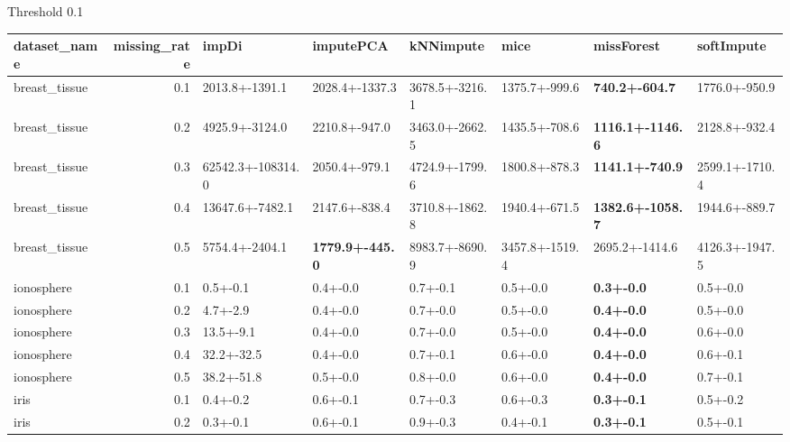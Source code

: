  Threshold 0.1 
 \begin{tabular}{lrllllll}
\toprule
 dataset_name &  missing_rate &             impDi &              imputePCA &      kNNimpute &           mice &              missForest &     softImpute \\
\midrule
breast_tissue &           0.1 &    2013.8+-1391.1 &         2028.4+-1337.3 & 3678.5+-3216.1 &  1375.7+-999.6 &   \textbf{740.2+-604.7} &  1776.0+-950.9 \\
breast_tissue &           0.2 &    4925.9+-3124.0 &          2210.8+-947.0 & 3463.0+-2662.5 &  1435.5+-708.6 & \textbf{1116.1+-1146.6} &  2128.8+-932.4 \\
breast_tissue &           0.3 & 62542.3+-108314.0 &          2050.4+-979.1 & 4724.9+-1799.6 &  1800.8+-878.3 &  \textbf{1141.1+-740.9} & 2599.1+-1710.4 \\
breast_tissue &           0.4 &   13647.6+-7482.1 &          2147.6+-838.4 & 3710.8+-1862.8 &  1940.4+-671.5 & \textbf{1382.6+-1058.7} &  1944.6+-889.7 \\
breast_tissue &           0.5 &    5754.4+-2404.1 & \textbf{1779.9+-445.0} & 8983.7+-8690.9 & 3457.8+-1519.4 &          2695.2+-1414.6 & 4126.3+-1947.5 \\
   ionosphere &           0.1 &          0.5+-0.1 &               0.4+-0.0 &       0.7+-0.1 &       0.5+-0.0 &       \textbf{0.3+-0.0} &       0.5+-0.0 \\
   ionosphere &           0.2 &          4.7+-2.9 &               0.4+-0.0 &       0.7+-0.0 &       0.5+-0.0 &       \textbf{0.4+-0.0} &       0.5+-0.0 \\
   ionosphere &           0.3 &         13.5+-9.1 &               0.4+-0.0 &       0.7+-0.0 &       0.5+-0.0 &       \textbf{0.4+-0.0} &       0.6+-0.0 \\
   ionosphere &           0.4 &        32.2+-32.5 &               0.4+-0.0 &       0.7+-0.1 &       0.6+-0.0 &       \textbf{0.4+-0.0} &       0.6+-0.1 \\
   ionosphere &           0.5 &        38.2+-51.8 &               0.5+-0.0 &       0.8+-0.0 &       0.6+-0.0 &       \textbf{0.4+-0.0} &       0.7+-0.1 \\
         iris &           0.1 &          0.4+-0.2 &               0.6+-0.1 &       0.7+-0.3 &       0.6+-0.3 &       \textbf{0.3+-0.1} &       0.5+-0.2 \\
         iris &           0.2 &          0.3+-0.1 &               0.6+-0.1 &       0.9+-0.3 &       0.4+-0.1 &       \textbf{0.3+-0.1} &       0.5+-0.1 \\

\end{tabular}
